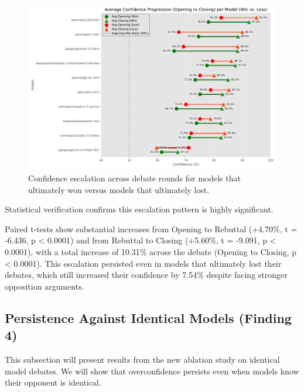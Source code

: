 \documentclass{article}
\begin{document}
\begin{figure}[h]
  \centering
  \includegraphics[width=0.9\linewidth]{figures/model_win_loss_escalation_dumbell.pdf}
  \caption{Confidence escalation across debate rounds for models that ultimately won versus models that ultimately lost.}
  \label{fig:confidence_trend_winner_loser}
\end{figure}

Statistical verification confirms this escalation pattern is highly significant.

Paired t-tests show substantial increases from Opening to Rebuttal (+4.70\%, t = -6.436, p < 0.0001) and from Rebuttal to Closing (+5.60\%, t = -9.091, p < 0.0001), with a total increase of 10.31\% across the debate (Opening to Closing, p < 0.0001). This escalation persisted even in models that ultimately lost their debates, which still increased their confidence by 7.54\% despite facing stronger opposition arguments.



\subsection{Persistence Against Identical Models (Finding 4)}
This subsection will present results from the new ablation study on identical model debates. We will show that overconfidence persists even when models know their opponent is identical.
\end{document}

